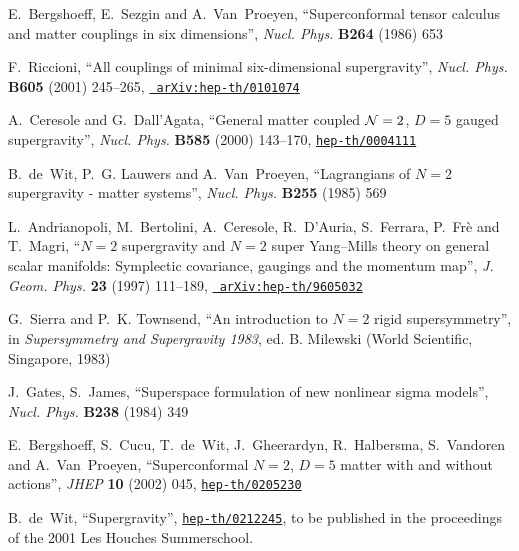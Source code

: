 \documentclass[a4paper,11pt,twoside]{article}
\begin{document}
\begin{thebibliography}{10}
{\sc E.~Bergshoeff, E.~Sezgin  and A.~Van~Proeyen}, ``Superconformal
tensor
  calculus and matter couplings in six dimensions'',  {\sl Nucl. Phys.} {\bf
  B264} (1986)
653

{\sc F.~Riccioni}, ``All couplings of minimal six-dimensional
supergravity'',
  {\sl Nucl. Phys.} {\bf B605} (2001) 245--265,
\href{http://www.arXiv.org/abs/arXiv:hep-th/0101074}{{\tt
  arXiv:hep-th/0101074}}

{\sc A.~Ceresole and G.~Dall'Agata}, ``General matter coupled ${\cal N} =
2$,
  $D = 5$ gauged supergravity'',  {\sl Nucl. Phys.} {\bf B585} (2000) 143--170,
\href{http://www.arXiv.org/abs/hep-th/0004111}{{\tt hep-th/0004111}}

{\sc B.~de~Wit, P.~G. Lauwers  and A.~Van~Proeyen}, ``Lagrangians of
$N=2$
  supergravity - matter systems'',  {\sl Nucl. Phys.} {\bf B255} (1985)
569

{\sc L.~Andrianopoli, M.~Bertolini, A.~Ceresole, R.~D'Auria, S.~Ferrara,
  P.~Fr{\`e}  and T.~Magri}, ``$N = 2$ supergravity and $N = 2$ super
  Yang--Mills theory on general scalar manifolds: Symplectic covariance,
  gaugings and the momentum map'',  {\sl J. Geom. Phys.} {\bf 23} (1997)
  111--189,
\href{http://www.arXiv.org/abs/arXiv:hep-th/9605032}{{\tt
  arXiv:hep-th/9605032}}

{\sc G.~Sierra and P.~K. Townsend}, ``An introduction to $N=2$ rigid
  supersymmetry'',
in {\em Supersymmetry and Supergravity 1983}, ed. B. Milewski (World
  Scientific, Singapore, 1983)

{\sc J.~Gates, S.~James}, ``Superspace formulation of new nonlinear sigma
  models'',  {\sl Nucl. Phys.} {\bf B238} (1984)
349

{\sc E.~Bergshoeff, S.~Cucu, T.~de~Wit, J.~Gheerardyn, R.~Halbersma,
  S.~Vandoren  and A.~Van~Proeyen}, ``Superconformal $N = 2$, $D = 5$ matter
  with and without actions'',  {\sl JHEP} {\bf 10} (2002) 045,
\href{http://www.arXiv.org/abs/hep-th/0205230}{{\tt hep-th/0205230}}

{\sc B.~de~Wit}, ``Supergravity'',
  \href{http://www.arXiv.org/abs/hep-th/0212245}{{\tt hep-th/0212245}},
to be published in the proceedings of the 2001 Les Houches Summerschool.

\end{thebibliography}\endgroup


\label{endxyzt}
\end{document}
